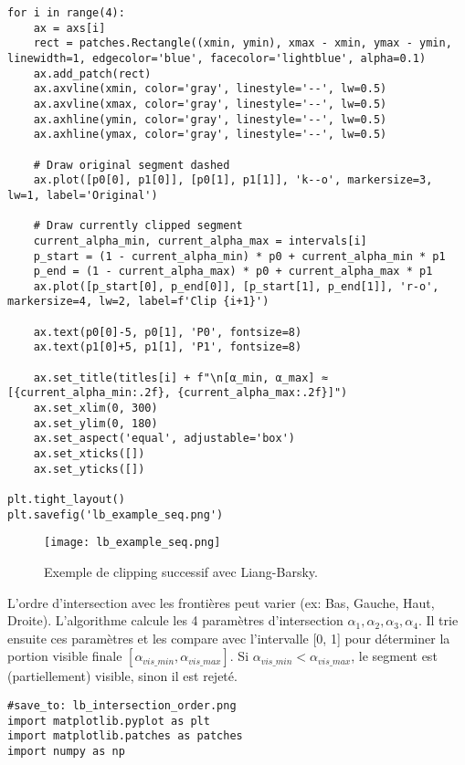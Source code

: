 \documentclass{article}
\begin{document}
{\begin{verbatim}
for i in range(4):
    ax = axs[i]
    rect = patches.Rectangle((xmin, ymin), xmax - xmin, ymax - ymin, linewidth=1, edgecolor='blue', facecolor='lightblue', alpha=0.1)
    ax.add_patch(rect)
    ax.axvline(xmin, color='gray', linestyle='--', lw=0.5)
    ax.axvline(xmax, color='gray', linestyle='--', lw=0.5)
    ax.axhline(ymin, color='gray', linestyle='--', lw=0.5)
    ax.axhline(ymax, color='gray', linestyle='--', lw=0.5)

    # Draw original segment dashed
    ax.plot([p0[0], p1[0]], [p0[1], p1[1]], 'k--o', markersize=3, lw=1, label='Original')

    # Draw currently clipped segment
    current_alpha_min, current_alpha_max = intervals[i]
    p_start = (1 - current_alpha_min) * p0 + current_alpha_min * p1
    p_end = (1 - current_alpha_max) * p0 + current_alpha_max * p1
    ax.plot([p_start[0], p_end[0]], [p_start[1], p_end[1]], 'r-o', markersize=4, lw=2, label=f'Clip {i+1}')

    ax.text(p0[0]-5, p0[1], 'P0', fontsize=8)
    ax.text(p1[0]+5, p1[1], 'P1', fontsize=8)

    ax.set_title(titles[i] + f"\n[α_min, α_max] ≈ [{current_alpha_min:.2f}, {current_alpha_max:.2f}]")
    ax.set_xlim(0, 300)
    ax.set_ylim(0, 180)
    ax.set_aspect('equal', adjustable='box')
    ax.set_xticks([])
    ax.set_yticks([])

plt.tight_layout()
plt.savefig('lb_example_seq.png')
\end{verbatim}

\begin{figure}[H]
\centering
\texttt{[image: lb\_example\_seq.png]}
\caption{Exemple de clipping successif avec Liang-Barsky.}
\label{fig:lb_example_seq}
\end{figure}

L'ordre d'intersection avec les frontières peut varier (ex: Bas, Gauche, Haut, Droite). L'algorithme calcule les 4 paramètres d'intersection $\alpha_1, \alpha_2, \alpha_3, \alpha_4$. Il trie ensuite ces paramètres et les compare avec l'intervalle [0, 1] pour déterminer la portion visible finale $[\alpha_{vis\_min}, \alpha_{vis\_max}]$. Si $\alpha_{vis\_min} < \alpha_{vis\_max}$, le segment est (partiellement) visible, sinon il est rejeté.

\begin{verbatim}
#save_to: lb_intersection_order.png
import matplotlib.pyplot as plt
import matplotlib.patches as patches
import numpy as np


\end{verbatim}}
\end{document}
